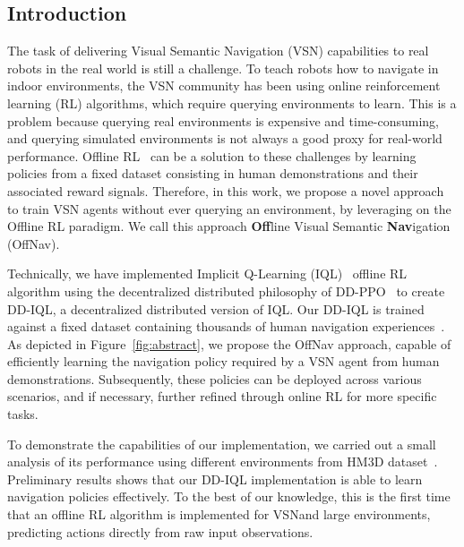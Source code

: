 \subsection{Introduction}\label{sec:introduction}

The task of delivering Visual Semantic Navigation (VSN) capabilities to real robots in the real world is still a challenge.
To teach robots how to navigate in indoor environments, the VSN community has been using online reinforcement learning (RL) algorithms, which require querying environments to learn.
This is a problem because querying real environments is expensive and time-consuming, and querying simulated environments is not always a good proxy for real-world performance.
Offline RL~\cite{levine2020} can be a solution to these challenges by learning policies from a fixed dataset consisting in human demonstrations and their associated reward signals.
Therefore, in this work, we propose a novel approach to train VSN agents without ever querying an environment, by leveraging on the Offline RL paradigm.
We call this approach \textbf{Off}line Visual Semantic \textbf{Nav}igation (OffNav).

Technically, we have implemented Implicit Q-Learning (IQL)~\cite{kostrikov2022offline} offline RL algorithm using the decentralized distributed philosophy of DD-PPO~\cite{wijmans2020} to create DD-IQL, a decentralized distributed version of IQL\@.
Our DD-IQL is trained against a fixed dataset containing thousands of human navigation experiences~\cite{ramrakhya2023}.
As depicted in Figure~\ref{fig:abstract}, we propose the OffNav approach, capable of efficiently learning the navigation policy required by a VSN agent from human demonstrations.
Subsequently, these policies can be deployed across various scenarios, and if necessary, further refined through online RL for more specific tasks.

To demonstrate the capabilities of our implementation, we carried out a small analysis of its performance using different environments from HM3D dataset~\cite{Ramakrishnan2021HabitatMatterport3D}.
Preliminary results shows that our DD-IQL implementation is able to learn navigation policies effectively.
To the best of our knowledge, this is the first time that an offline RL algorithm is implemented for VSN\@ and large environments, predicting actions directly from raw input observations.

